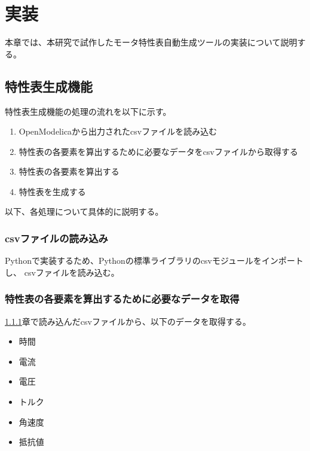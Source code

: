 \chapter{実装}\label{cha:Implementation}

本章では、本研究で試作したモータ特性表自動生成ツールの実装について説明する。

\section{特性表生成機能}\label{tokuseihyou_seisei}



特性表生成機能の処理の流れを以下に示す。
\begin{enumerate}
    \item OpenModelicaから出力されたcsvファイルを読み込む
    \item 特性表の各要素を算出するために必要なデータをcsvファイルから取得する
    \item 特性表の各要素を算出する
    \item 特性表を生成する
\end{enumerate}

以下、各処理について具体的に説明する。

\subsection{csvファイルの読み込み}\label{sub:csvfairu}
Pythonで実装するため、Pythonの標準ライブラリのcsvモジュールをインポートし、
csvファイルを読み込む。

\subsection{特性表の各要素を算出するために必要なデータを取得}\label{sub:syutoku_data}
\ref{sub:csvfairu}章で読み込んだcsvファイルから、以下のデータを取得する。

\begin{itemize}
    \item 時間
    \item 電流
    \item 電圧
    \item トルク
    \item 角速度
    \item 抵抗値
\end{itemize}

